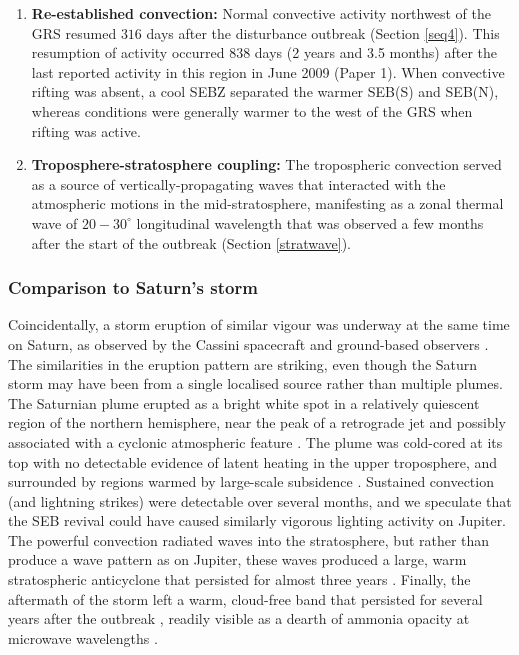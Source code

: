 \documentclass[final,authoryear,5p,times,twocolumn]{elsarticle}
\begin{document}
\begin{enumerate}
\item \textbf{Re-established convection: } Normal convective activity northwest of the GRS resumed $316$ days after the disturbance outbreak (Section \ref{seq4}).  This resumption of activity occurred 838 days (2 years and 3.5 months) after the last reported activity in this region in June 2009 (Paper 1).  When convective rifting was absent, a cool SEBZ separated the warmer SEB(S) and SEB(N), whereas conditions were generally warmer to the west of the GRS when rifting was active.
\item \textbf{Troposphere-stratosphere coupling: } The tropospheric convection served as a source of vertically-propagating waves that interacted with the atmospheric motions in the mid-stratosphere, manifesting as a zonal thermal wave of $20-30^\circ$ longitudinal wavelength that was observed a few months after the start of the outbreak (Section \ref{stratwave}).
\end{enumerate}

\subsubsection{Comparison to Saturn's storm}
Coincidentally, a storm eruption of similar vigour was underway at the same time on Saturn, as observed by the Cassini spacecraft and ground-based observers \citep{11sanchez, 11fischer, 11fletcher_storm, 12fletcher, 12sanchez, 13sayanagi, 14achterberg}.  The similarities in the eruption pattern are striking, even though the Saturn storm may have been from a single localised source rather than multiple plumes.  The Saturnian plume erupted as a bright white spot in a relatively quiescent region of the northern hemisphere, near the peak of a retrograde jet and possibly associated with a cyclonic atmospheric feature \citep[the `string of pearls',][]{14sayanagi}.  The plume was cold-cored at its top with no detectable evidence of latent heating in the upper troposphere, and surrounded by regions warmed by large-scale subsidence \citep{11fletcher_storm}.  Sustained convection (and lightning strikes) were detectable over several months, and we speculate that the SEB revival could have caused similarly vigorous lighting activity on Jupiter.  The powerful convection radiated waves into the stratosphere, but rather than produce a wave pattern as on Jupiter, these waves produced a large, warm stratospheric anticyclone that persisted for almost three years \citep{12fletcher}. Finally, the aftermath of the storm left a warm, cloud-free band that persisted for several years after the outbreak \citep{14achterberg, 14fletcher_texes}, readily visible as a dearth of ammonia opacity at microwave wavelengths \citep{13janssen, 13laraia}.  
\end{document}
